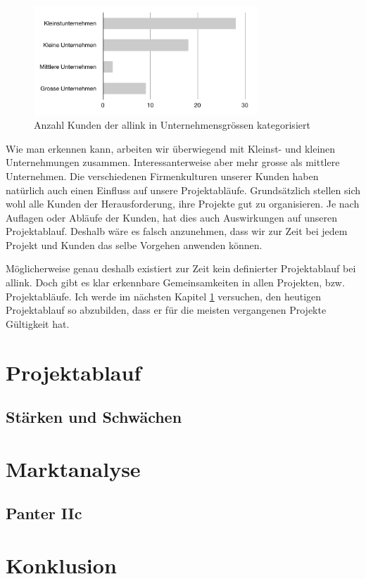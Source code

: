 \begin{figure}[htbp]
\begin{center}
\includegraphics[width=0.75\textwidth,angle=0]{./bilder/analyse/kundenkategorisierung.pdf}
\caption{Anzahl Kunden der allink in Unternehmensgrössen kategorisiert}
\label{pic:kundenkategorisierung}
\end{center}
\end{figure}

Wie man erkennen kann, arbeiten wir überwiegend mit Kleinst- und kleinen 
Unternehmungen zusammen. Interessanterweise aber mehr grosse als mittlere
Unternehmen.
Die verschiedenen Firmenkulturen unserer Kunden haben natürlich auch einen Einfluss 
auf unsere Projektabläufe. Grundsätzlich stellen sich wohl alle Kunden
der Herausforderung, ihre Projekte gut zu organisieren. Je nach Auflagen oder
Abläufe der Kunden, hat dies auch Auswirkungen auf unseren Projektablauf.
Deshalb wäre es falsch anzunehmen, dass wir zur Zeit bei jedem Projekt und 
Kunden das selbe Vorgehen anwenden können.

Möglicherweise genau deshalb existiert zur Zeit kein definierter Projektablauf
bei allink. Doch gibt es klar erkennbare Gemeinsamkeiten in allen Projekten,
bzw. Projektabläufe. Ich werde im nächsten Kapitel \ref{chap:projektablauf} 
versuchen, den heutigen Projektablauf so abzubilden, dass er für die meisten
vergangenen Projekte Gültigkeit hat.

\section{Projektablauf}\label{chap:projektablauf}


% 

\subsection{Stärken und Schwächen}


\section{Marktanalyse}
\subsection{Panter IIc}

\section{Konklusion}
